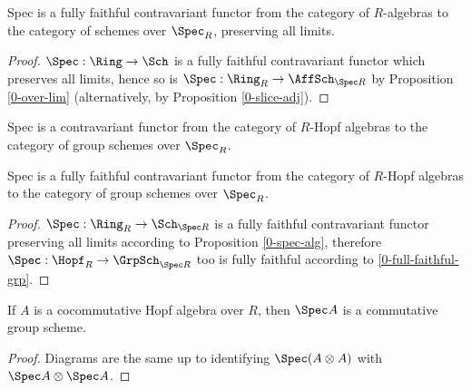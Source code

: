 \begin{proposition}
  \label{0-full-faithful-spec-alg}
  \leanok

  Spec is a fully faithful contravariant functor from the category of $R$-algebras to the category of schemes over $\Spec_R$, preserving all limits.
\end{proposition}
\begin{proof}
  \leanok

  $\Spec : \Ring \to \Sch$ is a fully faithful contravariant functor which preserves all limits, hence so is $\Spec : \Ring_R \to \AffSch_{\Spec R}$ by Proposition \ref{0-over-lim} (alternatively, by Proposition \ref{0-slice-adj}).
\end{proof}


\begin{definition}
  \label{0-spec-hopf}
  \leanok

  Spec is a contravariant functor from the category of $R$-Hopf algebras to the category of group schemes over $\Spec_R$.
\end{definition}


\begin{proposition}
  \label{0-full-faithful-spec-hopf}
  \leanok

  Spec is a fully faithful contravariant functor from the category of $R$-Hopf algebras to the category of group schemes over $\Spec_R$.
\end{proposition}
\begin{proof}
  \leanok

  $\Spec : \Ring_R \to \Sch_{\Spec R}$ is a fully faithful contravariant functor preserving all limits according to Proposition \ref{0-spec-alg}, therefore $\Spec : \Hopf_R \to \GrpSch_{\Spec R}$ too is fully faithful according to \ref{0-full-faithful-grp}.
\end{proof}


\begin{proposition}
  \label{0-spec-cocomm-hopf}
  \leanok

  If $A$ is a cocommutative Hopf algebra over $R$, then $\Spec A$ is a commutative group scheme.
\end{proposition}
\begin{proof}
  \uses{}
  \leanok

  Diagrams are the same up to identifying $\Spec (A \otimes A)$ with $\Spec A \otimes \Spec A$.
\end{proof}


